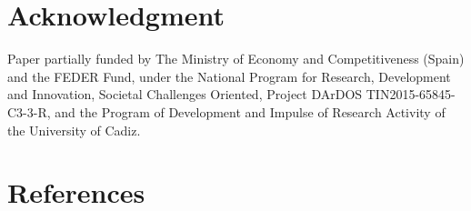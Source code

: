 \documentclass[review]{elsarticle}
\begin{document}
\section*{Acknowledgment}

Paper partially funded by The Ministry of Economy and Competitiveness (Spain) and the FEDER Fund, under the National Program for 
Research, Development and Innovation, Societal Challenges Oriented, Project DArDOS TIN2015-65845-C3-3-R, and the Program of
Development and Impulse of Research Activity of the University of Cadiz.

\section*{References}


\end{document}
